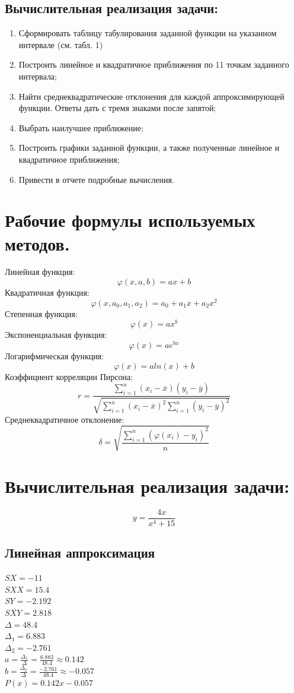 \documentclass[12pt,one column]{article}
\begin{document}
\subsection{Вычислительная реализация задачи:}
\begin{enumerate}
    \item Сформировать таблицу табулирования заданной функции на
указанном интервале (см. табл. 1)
    \item Построить линейное и квадратичное приближения по 11 точкам
заданного интервала;
    \item Найти среднеквадратические отклонения для каждой
аппроксимирующей функции. Ответы дать с тремя знаками после
запятой;
    \item Выбрать наилучшее приближение;
    \item Построить графики заданной функции, а также полученные
линейное и квадратичное приближения;
    \item Привести в отчете подробные вычисления.
\end{enumerate}
\section{Рабочие формулы используемых методов.}
Линейная функция: $$\varphi (x, a,b) = ax+b$$
Квадратичная функция: $$\varphi (x, a_0, a_1, a_2) = a_0+a_1x+a_2x^2$$
Степенная функция: $$\varphi(x) = ax^b$$
Экспоненциальная функция: $$\varphi(x) = ae^{bx}$$
Логарифмическая функция: $$\varphi(x) = aln(x)+b$$
Коэффициент корреляции Пирсона: 
$$r = \frac{\sum \limits_{i=1}^n (x_i - \overline{x})(y_i-\overline{y})}{\sqrt{\sum \limits_{i=1}^n(x_i-\overline{x})^2\sum \limits_{i=1}^n(y_i-\overline{y})^2}}$$
Среднеквадратичное отклонение:
$$\delta = \sqrt{\frac{\sum\limits_{i=1}^n(\varphi(x_i)-y_i)^2}{n}}$$
\section{Вычислительная реализация задачи:}
$$y = \frac{4x}{x^4+15}$$
\subsection{Линейная аппроксимация}
\FloatBarrier

$SX = -11$\\
$SXX = 15.4$\\
$SY = -2.192$\\
$SXY = 2.818$\\
$\Delta = 48.4$\\
$\Delta_1 = 6.883$\\
$\Delta_2 = -2.761$\\
$a = \frac{\Delta_1}{\Delta}= \frac{6.883}{48.4} \approx 0.142$\\
$b = \frac{\Delta_2}{\Delta}= \frac{-2.761}{48.4} \approx -0.057$\\
$P(x) = 0.142x-0.057$
\FloatBarrier

\end{document}

